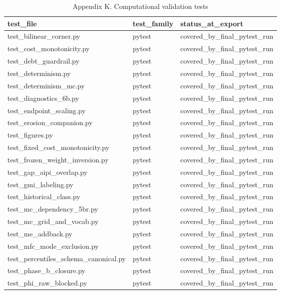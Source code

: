 \begin{table}[!htbp]
\centering
\caption{Appendix K. Computational validation tests}
\begin{tabular}{lll}
\toprule
test\_file & test\_family & status\_at\_export \\
\midrule
test\_bilinear\_corner.py & pytest & covered\_by\_final\_pytest\_run \\
test\_cost\_monotonicity.py & pytest & covered\_by\_final\_pytest\_run \\
test\_debt\_guardrail.py & pytest & covered\_by\_final\_pytest\_run \\
test\_determinism.py & pytest & covered\_by\_final\_pytest\_run \\
test\_determinism\_mc.py & pytest & covered\_by\_final\_pytest\_run \\
test\_diagnostics\_6b.py & pytest & covered\_by\_final\_pytest\_run \\
test\_endpoint\_scaling.py & pytest & covered\_by\_final\_pytest\_run \\
test\_erosion\_companion.py & pytest & covered\_by\_final\_pytest\_run \\
test\_figures.py & pytest & covered\_by\_final\_pytest\_run \\
test\_fixed\_cost\_monotonicity.py & pytest & covered\_by\_final\_pytest\_run \\
test\_frozen\_weight\_inversion.py & pytest & covered\_by\_final\_pytest\_run \\
test\_gap\_aipi\_overlap.py & pytest & covered\_by\_final\_pytest\_run \\
test\_gmi\_labeling.py & pytest & covered\_by\_final\_pytest\_run \\
test\_historical\_class.py & pytest & covered\_by\_final\_pytest\_run \\
test\_mc\_dependency\_5br.py & pytest & covered\_by\_final\_pytest\_run \\
test\_mc\_grid\_and\_vocab.py & pytest & covered\_by\_final\_pytest\_run \\
test\_me\_addback.py & pytest & covered\_by\_final\_pytest\_run \\
test\_mfc\_mode\_exclusion.py & pytest & covered\_by\_final\_pytest\_run \\
test\_percentiles\_schema\_canonical.py & pytest & covered\_by\_final\_pytest\_run \\
test\_phase\_b\_closure.py & pytest & covered\_by\_final\_pytest\_run \\
test\_phi\_raw\_blocked.py & pytest & covered\_by\_final\_pytest\_run \\

\end{tabular}
\end{table}
